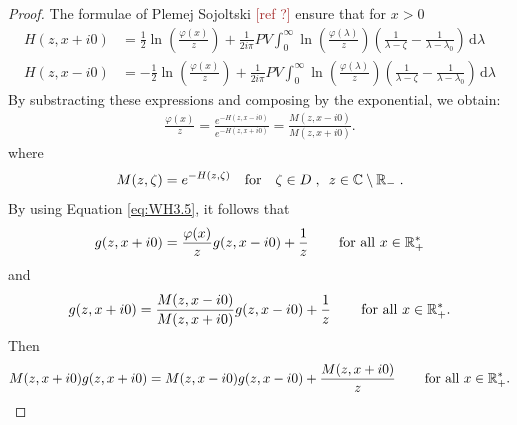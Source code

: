 \documentclass[11pt]{amsart}
\newcommand{\cte}{}
\newcommand{\diff}{\,\mathrm{d}}
\newcommand{\ndr}[1]{\textcolor{brown}{[#1]}}
\begin{document}
\begin{proof}
The formulae of Plemej Sojoltski \ndr{ref ?} ensure that for $x > 0$
    \begin{align*}
        H(z,x+i0) &= \frac{1}{2} \ln\left(\frac{\varphi(x)}{z}\right) + \frac{1}{2i\pi } PV\int_0^\infty \ln\left(\frac{\varphi(\lambda)}{z}\right) \left( \frac{1}{\lambda-\zeta} - \frac{1}{\lambda-\lambda_0}\right) \diff \lambda\\
        H(z,x-i0) &= -\frac{1}{2} \ln\left(\frac{\varphi(x)}{z}\right) + \frac{1}{2i\pi } PV\int_0^\infty \ln\left(\frac{\varphi(\lambda)}{z}\right)\left( \frac{1}{\lambda-\zeta} - \frac{1}{\lambda-\lambda_0}\right) \diff \lambda
    \end{align*}
By substracting these expressions and composing by the exponential, we obtain:
\begin{align*}
    \frac{\varphi(x)}{z}
    = \frac{e^{-H(z,x-i0)}}{e^{-H(z,x+i0)}} 
    = \frac{M(z,x-i0)}{M(z,x+i0)}.
\end{align*}
where 
\begin{equation}
    M(z,\zeta) = e^{-H(z,\zeta)}
    \quad \text{for} \quad
    \zeta \in D
    \; , \enspace z \in \mathbb{C} \setminus \mathbb{R}_- \; .
    \label{def:M}
\end{equation}
By using Equation \eqref{eq:WH3.5}, it follows that 
\begin{align*}
    g(z, x+i0) = \frac{\varphi(x)}{z} g(z, x-i0) + \frac{1}{z} \, \qquad \text{for all $x\in\mathbb{R}_+^*$}
\end{align*}
and 
\begin{align*}
    g(z, x+i0) = \frac{M(z,x-i0)}{M(z,x+i0)} g(z, x-i0) + \frac{1}{z} \, \qquad \text{for all $x\in\mathbb{R}_+^*$}.
\end{align*}
Then 
\begin{align*}
    M(z,x+i0)g(z, x+i0) = M(z,x-i0)g(z, x-i0) + \frac{M(z,x+i0)}{\cte  z} \, \qquad \text{for all $x\in\RR_+^*$}.
\end{align*}


\end{proof}
\end{document}
